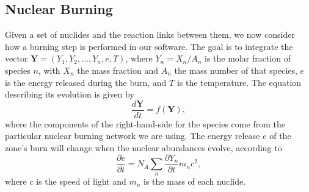 \documentclass[twocolumn,numberedappendix]{../aastex6}
\begin{document}
\subsection{Nuclear Burning}
\label{sec:burner}

Given a set of nuclides and the reaction links between them, we now consider
how a burning step is performed in our software. The goal is to integrate the
vector ${\bm{Y}} = (Y_1, Y_2, \ldots, Y_n, e, T)$, where $Y_{n} = X_{n} / A_{n}$
is the molar fraction of species $n$, with $X_n$ the mass fraction and $A_n$ the
mass number of that species, $e$ is the energy released during the burn, and
$T$ is the temperature. The equation describing its evolution is given by
\begin{equation}
  \frac{d\bm{Y}}{dt} = f(\mathbf{Y}),
\end{equation}
where the components of the right-hand-side for the species come from the particular
nuclear burning network we are using. The energy release $e$ of the zone's burn
will change when the nuclear abundances evolve, according to
\begin{equation}
  \frac{\partial e}{\partial t} = N_A \sum_{n} \frac{\partial Y_{n}}{\partial t} m_{n} c^2,
\end{equation}
where $c$ is the speed of light and $m_n$ is the mass of each nuclide.
\end{document}

